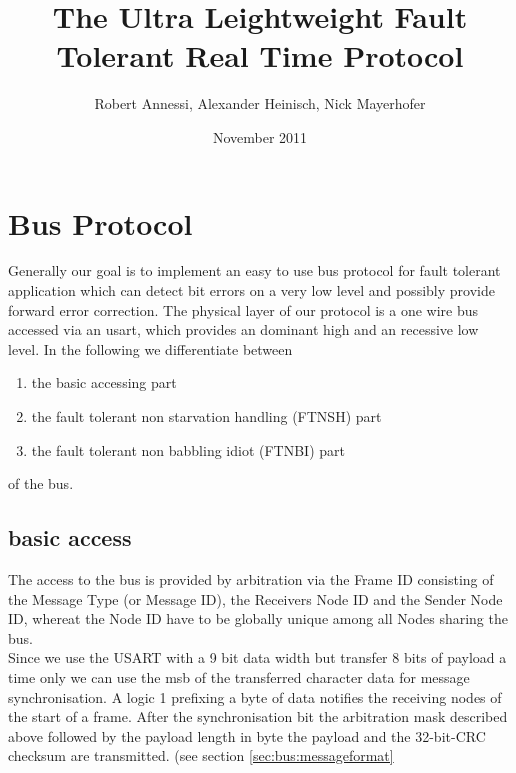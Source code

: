 \documentclass[11pt,a4paper,oneside]{report}
\begin{document}
\setcounter{section}{0}
\clearpage
{}

\title{The Ultra Leightweight Fault Tolerant Real Time Protocol}
\author{Robert Annessi, Alexander Heinisch, Nick Mayerhofer}
\date{November 2011}

\maketitle

\section{Bus Protocol}

Generally our goal is to implement an easy to use bus protocol for fault tolerant application which can detect bit errors on a very low level and possibly provide forward error correction.
The physical layer of our protocol is a one wire bus accessed via an usart, which provides an dominant high and an recessive low level.
In the following we differentiate between

\begin{enumerate}
 \item the basic accessing part 
 \item the fault tolerant non starvation handling (FTNSH) part
 \item the fault tolerant non babbling idiot (FTNBI) part
\end{enumerate}

of the bus.\\

\label{figure:bus:basicaccess:statemachine}


\subsection{basic access}
\label{sec:bus:basicaccess}

The access to the bus is provided by arbitration via the Frame ID consisting of the Message Type (or Message ID), the Receivers Node ID  and the Sender Node ID, whereat the Node ID have to be globally unique among all Nodes sharing the bus.\\
Since we use the USART with a 9 bit data width but transfer 8 bits of payload a time only we can use the msb of the transferred character data for message synchronisation. A logic 1 prefixing a byte of data notifies the receiving nodes of the start of a frame.
After the synchronisation bit the arbitration mask described above followed by the payload length in byte the payload and the 32-bit-CRC checksum are transmitted. (see section \ref{sec:bus:messageformat}\\
\end{document}
